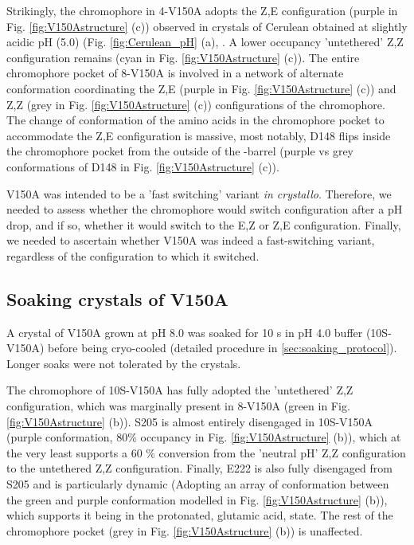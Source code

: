 Strikingly, the chromophore in 4-V150A adopts the Z,E configuration (purple in Fig. \ref{fig:V150Astructure} (c)) observed in crystals of Cerulean obtained at slightly acidic pH (5.0) (Fig. \ref{fig:Cerulean_pH} (a), \parencite{gotthardChromophoreIsomerStabilization2017a}. A lower occupancy 'untethered' Z,Z configuration remains (cyan in Fig. \ref{fig:V150Astructure} (c)). The entire chromophore pocket of 8-V150A is involved in a network of alternate conformation coordinating the Z,E (purple in Fig. \ref{fig:V150Astructure} (c)) and Z,Z (grey in Fig. \ref{fig:V150Astructure} (c)) configurations of the chromophore. The change of conformation of the amino acids in the chromophore pocket to accommodate the Z,E configuration is massive, most notably, D148 flips inside the chromophore pocket from the outside of the \textbeta-barrel (purple vs grey conformations of D148 in Fig. \ref{fig:V150Astructure} (c)).

V150A was intended to be a 'fast switching' variant \textit{in crystallo}. Therefore, we needed to assess whether the chromophore would switch configuration after a pH drop, and if so, whether it would switch to the E,Z or Z,E configuration. Finally, we needed to ascertain whether V150A was indeed a fast-switching variant, regardless of the configuration to which it switched. 

\subsection{Soaking crystals of V150A}

A crystal of V150A grown at pH 8.0 was soaked for 10 s in pH 4.0 buffer (10S-V150A) before being cryo-cooled (detailed procedure in \ref{sec:soaking_protocol}). Longer soaks were not tolerated by the crystals. 

The chromophore of 10S-V150A has fully adopted the 'untethered' Z,Z configuration, which was marginally present in 8-V150A (green in Fig. \ref{fig:V150Astructure} (b)). S205 is almost entirely disengaged in 10S-V150A (purple conformation, 80\% occupancy in Fig. \ref{fig:V150Astructure} (b)), which at the very least supports a 60 \% conversion from the 'neutral pH' Z,Z configuration to the untethered Z,Z configuration. Finally, E222 is also fully disengaged from S205 and is particularly dynamic (Adopting an array of conformation between the green and purple conformation modelled in Fig. \ref{fig:V150Astructure} (b)), which supports it being in the protonated, glutamic acid, state. The rest of the chromophore pocket (grey in Fig. \ref{fig:V150Astructure} (b)) is unaffected. 


